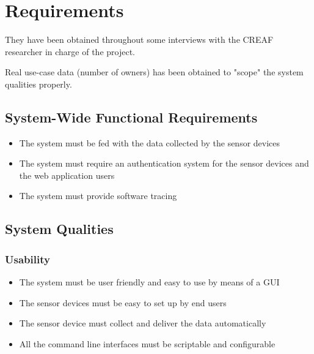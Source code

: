 \chapter{Requirements}

They have been obtained throughout some interviews with the CREAF researcher in charge of the project.

Real use-case data (number of owners) has been obtained to "scope" the system qualities properly.

\section{System-Wide Functional Requirements}

\begin{itemize}
	\item The system must be fed with the data collected by the sensor devices
	\item The system must require an authentication system for the sensor devices and the web application users
	\item The system must provide software tracing
\end{itemize}

\section{System Qualities}

\subsection{Usability}

\begin{itemize}
	\item The system must be user friendly and easy to use by means of a GUI
	\item The sensor devices must be easy to set up by end users
	\item The sensor device must collect and deliver the data automatically
	\item All the command line interfaces must be scriptable and configurable
\end{itemize}


